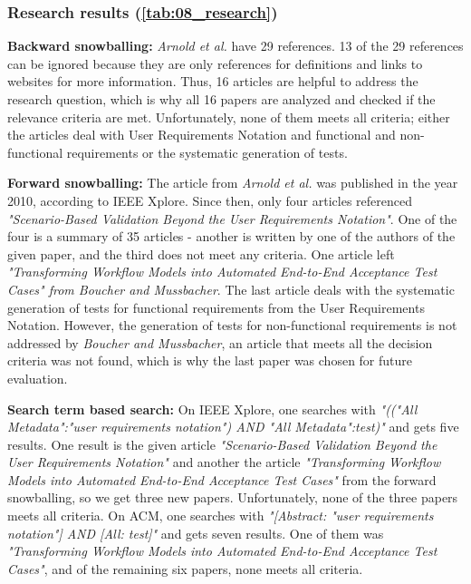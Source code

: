 \subsubsection{Research results (\autoref{tab:08_research})}

\textbf{Backward snowballing:} \textit{Arnold et al.} have 29 references. 13 of the 29 references can be ignored because they are only references for definitions and links to websites for more information. Thus, 16 articles are helpful to address the research question, which is why all 16 papers are analyzed and checked if the relevance criteria are met. Unfortunately, none of them meets all criteria; either the articles deal with User Requirements Notation and functional and non-functional requirements or the systematic generation of tests. 

\textbf{Forward snowballing:} The article from \textit{Arnold et al.} was published in the year 2010, according to IEEE Xplore. Since then, only four articles referenced \textit{"Scenario-Based Validation Beyond the User Requirements Notation"}. One of the four is a summary of 35 articles - another is written by one of the authors of the given paper, and the third does not meet any criteria. One article left \textit{"Transforming Workflow Models into Automated End-to-End Acceptance Test Cases" from Boucher and Mussbacher}. The last article deals with the systematic generation of tests for functional requirements from the User Requirements Notation. However, the generation of tests for non-functional requirements is not addressed by \textit{Boucher and Mussbacher}, an article that meets all the decision criteria was not found, which is why the last paper was chosen for future evaluation.

\textbf{Search term based search:} On IEEE Xplore, one searches with \textit{"(("All Metadata":"user requirements notation") AND "All Metadata":test)"} and gets five results. One result is the given article \textit{"Scenario-Based Validation Beyond the User Requirements Notation"} and another the article \textit{"Transforming Workflow Models into Automated End-to-End Acceptance Test Cases"} from the forward snowballing, so we get three new papers. Unfortunately, none of the three papers meets all criteria. On ACM, one searches with \textit{"[Abstract: "user requirements notation"] AND [All: test]"} and gets seven results. One of them was \textit{"Transforming Workflow Models into Automated End-to-End Acceptance Test Cases"}, and of the remaining six papers, none meets all criteria.

